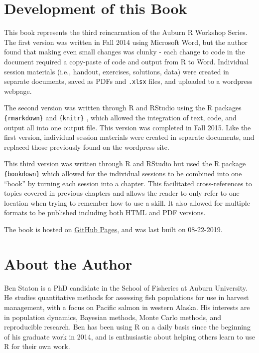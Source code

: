 \documentclass[]{book}
\begin{document}
\hypertarget{development-of-this-book}{%
\section*{Development of this Book}\label{development-of-this-book}}

This book represents the third reincarnation of the Auburn R Workshop Series. The first version was written in Fall 2014 using Microsoft Word, but the author found that making even small changes was clunky - each change to code in the document required a copy-paste of code and output from R to Word. Individual session materials (i.e., handout, exercises, solutions, data) were created in separate documents, saved as PDFs and \texttt{.xlsx} files, and uploaded to a wordpress webpage.

The second version was written through R \citep{R-base} and RStudio using the R packages \texttt{\{rmarkdown\}} \citep{R-rmarkdown} and \texttt{\{knitr\}} \citep{R-knitr, knitr-cite}, which allowed the integration of text, code, and output all into one output file. This version was completed in Fall 2015. Like the first version, individual session materials were created in separate documents, and replaced those previously found on the wordpress site.

This third version was written through R and RStudio but used the R package \texttt{\{bookdown\}} \citep{R-bookdown} which allowed for the individual sessions to be combined into one ``book'' by turning each session into a chapter. This facilitated cross-references to topics covered in previous chapters and allows the reader to only refer to one location when trying to remember how to use a skill. It also allowed for multiple formats to be published including both HTML and PDF versions.

The book is hosted on \href{https://pages.github.com/}{GitHub Pages}, and was last built on 08-22-2019.

\hypertarget{about-the-author}{%
\section*{About the Author}\label{about-the-author}}

Ben Staton is a PhD candidate in the School of Fisheries at Auburn University. He studies quantitative methods for assessing fish populations for use in harvest management, with a focus on Pacific salmon in western Alaska. His interests are in population dynamics, Bayesian methods, Monte Carlo methods, and reproducible research. Ben has been using R on a daily basis since the beginning of his graduate work in 2014, and is enthusiastic about helping others learn to use R for their own work.
\end{document}

